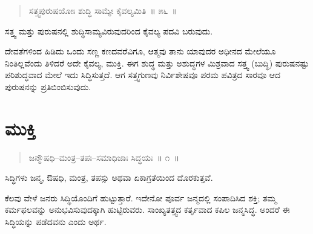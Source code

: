 \begin{verse}
ಸತ್ತ್ವಪುರುಷಯೋಃ ಶುದ್ಧಿ ಸಾಮ್ಯೇ ಕೈವಲ್ಯಮಿತಿ~॥ ೫೬~॥
\end{verse}

\vspace{-0.3cm}

ಸತ್ತ್ವ ಮತ್ತು ಪುರುಷನಲ್ಲಿ ಶುದ್ಧಿಸಾಮ್ಯವಿರುವುದರಿಂದ ಕೈವಲ್ಯ ಪದವಿ ಬರುವುದು. 

ದೇವತೆಗಳಿಂದ ಹಿಡಿದು ಒಂದು ಸಣ್ಣ ಕಣದವರೆವಿಗೂ, ಆತ್ಮವು ತಾನು ಯಾವುದರ ಅಧೀನದ ಮೇಲೆಯೂ ನಿಂತಿಲ್ಲವೆಂದು ತಿಳಿದರೆ ಅದೇ ಕೈವಲ್ಯ, ಮುಕ್ತಿ. ಈಗ ಶುದ್ಧ ಮತ್ತು ಅಶುದ್ಧಗಳ ಮಿಶ್ರವಾದ ಸತ್ತ್ವ (ಬುದ್ಧಿ) ಪುರುಷನಷ್ಟು ಪರಿಶುದ್ಧವಾದ ಮೇಲೆ ಇದು ಸಿದ್ಧಿಸುತ್ತದೆ. ಆಗ ಸತ್ತ್ವಗುಣವು ನಿರ್ವಿಶೇಷವೂ ಪರಮ ಪವಿತ್ರದ ಸಾರವೂ ಆದ ಪುರುಷನನ್ನು ಪ್ರತಿಬಿಂಬಿಸುವುದು.

\chapter{ಮುಕ್ತಿ}

\begin{verse}
ಜನ್ಮೌಷಧಿ–ಮಂತ್ರ–ತಪಃ–ಸಮಾಧಿಜಾಃ ಸಿದ್ಧಯಃ~॥ ೧~॥
\end{verse}

\vspace{-0.4cm}

ಸಿದ್ಧಿಗಳು ಜನ್ಮ, ಔಷಧಿ, ಮಂತ್ರ, ತಪಸ್ಸು ಅಥವಾ ಏಕಾಗ್ರತೆಯಿಂದ ದೊರಕುತ್ತವೆ. 

ಕೆಲವು ವೇಳೆ ಜನರು ಸಿದ್ಧಿಯೊಂದಿಗೆ ಹುಟ್ಟುತ್ತಾರೆ. ಇದೇನೋ ಪೂರ್ವ ಜನ್ಮದಲ್ಲಿ ಸಂಪಾದಿಸಿದ ಶಕ್ತಿ; ತಮ್ಮ ಕರ್ಮಫಲವನ್ನು ಅನುಭವಿಸುವುದಕ್ಕಾಗಿ ಹುಟ್ಟಿರುವರು. ಸಾಂಖ್ಯತತ್ತ್ವದ ಕರ್ತೃವಾದ ಕಪಿಲ ಜನ್ಮಸಿದ್ಧ. ಅಂದರೆ ಈ ಸಿದ್ಧಿಯನ್ನು ಪಡೆದವನು ಎಂದು ಅರ್ಥ. 

\vskip 4pt

